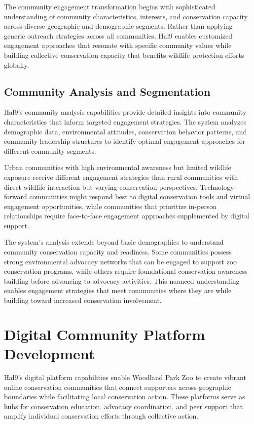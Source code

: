 \documentclass[
  Letterpaper,
]{scrbook}
\begin{document}
The community engagement transformation begins with sophisticated
understanding of community characteristics, interests, and conservation
capacity across diverse geographic and demographic segments. Rather than
applying generic outreach strategies across all communities, Hal9
enables customized engagement approaches that resonate with specific
community values while building collective conservation capacity that
benefits wildlife protection efforts globally.

\subsection{Community Analysis and
Segmentation}\label{community-analysis-and-segmentation}

Hal9's community analysis capabilities provide detailed insights into
community characteristics that inform targeted engagement strategies.
The system analyzes demographic data, environmental attitudes,
conservation behavior patterns, and community leadership structures to
identify optimal engagement approaches for different community segments.

Urban communities with high environmental awareness but limited wildlife
exposure receive different engagement strategies than rural communities
with direct wildlife interaction but varying conservation perspectives.
Technology-forward communities might respond best to digital
conservation tools and virtual engagement opportunities, while
communities that prioritize in-person relationships require face-to-face
engagement approaches supplemented by digital support.

The system's analysis extends beyond basic demographics to understand
community conservation capacity and readiness. Some communities possess
strong environmental advocacy networks that can be engaged to support
zoo conservation programs, while others require foundational
conservation awareness building before advancing to advocacy activities.
This nuanced understanding enables engagement strategies that meet
communities where they are while building toward increased conservation
involvement.

\section{Digital Community Platform
Development}\label{digital-community-platform-development}

Hal9's digital platform capabilities enable Woodland Park Zoo to create
vibrant online conservation communities that connect supporters across
geographic boundaries while facilitating local conservation action.
These platforms serve as hubs for conservation education, advocacy
coordination, and peer support that amplify individual conservation
efforts through collective action.
\end{document}
